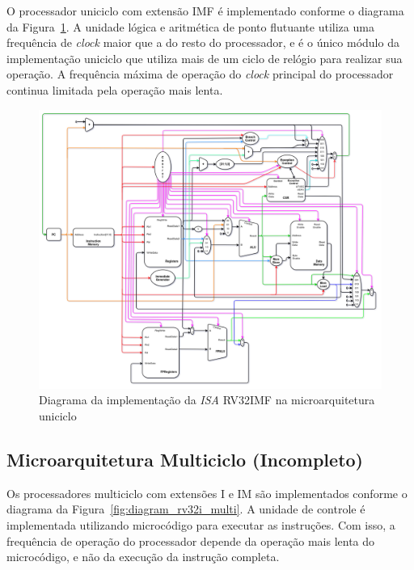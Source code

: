         { O processador uniciclo com extensão IMF é implementado conforme o
            diagrama da Figura~\ref{fig:diagram_rv32imf_uni}. A unidade lógica e
            aritmética de ponto flutuante utiliza uma frequência de \textit{clock}
            maior que a do resto do processador, e é o único módulo da implementação
            uniciclo que utiliza mais de um ciclo de relógio para realizar sua
            operação. A frequência máxima de operação do \textit{clock} principal
            do processador continua limitada pela operação mais lenta.
        }

        \begin{figure}[H]
        \centering
            \includegraphics[width=.9\linewidth]{../images/uarch_diagrams/singlecycle-RV32IMF.png}
            \caption{Diagrama da implementação da \textit{ISA} RV32IMF na
            microarquitetura uniciclo}\label{fig:diagram_rv32imf_uni}
        \end{figure}

    \subsection{Microarquitetura Multiciclo (Incompleto)}
        { Os processadores multiciclo com extensões I e IM são implementados
            conforme o diagrama da Figura~\ref{fig:diagram_rv32i_multi}. A
            unidade de controle é implementada utilizando microcódigo para
            executar as instruções. Com isso, a frequência de operação do
            processador depende da operação mais lenta do microcódigo, e não da
            execução da instrução completa.
        }


